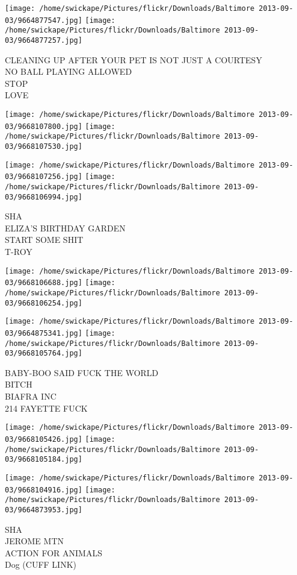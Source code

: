 \documentclass[10pt,letterpaper]{article}
\begin{document}
\texttt{[image: /home/swickape/Pictures/flickr/Downloads/Baltimore 2013-09-03/9664877547.jpg]}
\texttt{[image: /home/swickape/Pictures/flickr/Downloads/Baltimore 2013-09-03/9664877257.jpg]}

CLEANING UP AFTER YOUR PET IS NOT JUST A COURTESY\\
NO BALL PLAYING ALLOWED\\
STOP\\
LOVE
\pagebreak

\texttt{[image: /home/swickape/Pictures/flickr/Downloads/Baltimore 2013-09-03/9668107800.jpg]}
\texttt{[image: /home/swickape/Pictures/flickr/Downloads/Baltimore 2013-09-03/9668107530.jpg]}

\texttt{[image: /home/swickape/Pictures/flickr/Downloads/Baltimore 2013-09-03/9668107256.jpg]}
\texttt{[image: /home/swickape/Pictures/flickr/Downloads/Baltimore 2013-09-03/9668106994.jpg]}

SHA\\
ELIZA'S BIRTHDAY GARDEN\\
START SOME SHIT\\
T{-}ROY
\pagebreak

\texttt{[image: /home/swickape/Pictures/flickr/Downloads/Baltimore 2013-09-03/9668106688.jpg]}
\texttt{[image: /home/swickape/Pictures/flickr/Downloads/Baltimore 2013-09-03/9668106254.jpg]}

\texttt{[image: /home/swickape/Pictures/flickr/Downloads/Baltimore 2013-09-03/9664875341.jpg]}
\texttt{[image: /home/swickape/Pictures/flickr/Downloads/Baltimore 2013-09-03/9668105764.jpg]}

BABY{-}BOO SAID FUCK THE WORLD\\
BITCH\\
BIAFRA INC\\
214 FAYETTE FUCK
\pagebreak

\texttt{[image: /home/swickape/Pictures/flickr/Downloads/Baltimore 2013-09-03/9668105426.jpg]}
\texttt{[image: /home/swickape/Pictures/flickr/Downloads/Baltimore 2013-09-03/9668105184.jpg]}

\texttt{[image: /home/swickape/Pictures/flickr/Downloads/Baltimore 2013-09-03/9668104916.jpg]}
\texttt{[image: /home/swickape/Pictures/flickr/Downloads/Baltimore 2013-09-03/9664873953.jpg]}

SHA\\
JEROME MTN\\
ACTION FOR ANIMALS\\
Dog (CUFF LINK)
\pagebreak
\end{document}
